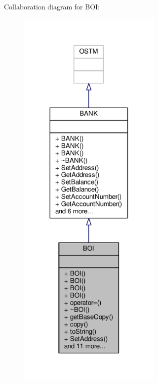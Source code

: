 Collaboration diagram for B\+OI\+:
\nopagebreak
\begin{figure}[H]
\begin{center}
\leavevmode
\includegraphics[width=198pt]{class_b_o_i__coll__graph}
\end{center}
\end{figure}
